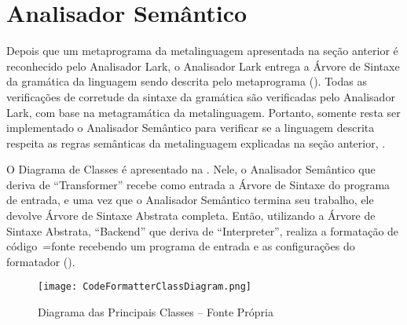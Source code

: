 \section{Analisador Semântico}

Depois que um metaprograma da metalinguagem apresentada na seção anterior é reconhecido pelo Analisador Lark,
o Analisador Lark entrega a Árvore de Sintaxe da gramática da linguagem sendo descrita pelo metaprograma ().
Todas as verificações de corretude da sintaxe da gramática são verificadas pelo Analisador Lark,
com base na metagramática da metalinguagem.
Portanto,
somente resta ser implementado o Analisador Semântico para verificar se a linguagem descrita respeita as regras semânticas da metalinguagem explicadas na seção anterior,
.

O Diagrama de Classes é apresentado na .
Nele,
o Analisador Semântico que deriva de ``Transformer'' recebe como entrada a Árvore de Sintaxe do programa de entrada,
e uma vez que o Analisador Semântico termina seu trabalho,
ele devolve Árvore de Sintaxe Abstrata completa.
Então,
utilizando a Árvore de Sintaxe Abstrata,
``Backend'' que deriva de ``Interpreter'',
realiza a formatação de código~=fonte recebendo um programa de entrada e
as configurações do formatador ().
\begin{figure}[h]
\centering
\texttt{[image: CodeFormatterClassDiagram.png]}
\caption[Diagrama das Principais Classes]{Diagrama das Principais Classes -- Fonte Própria}
\label{CodeFormatterClassDiagram}
\end{figure}

